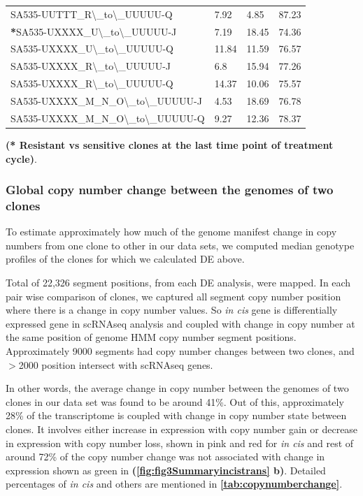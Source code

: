 \begin{table}[htbp]
\begin{tabular}{|l|l|l|l|}
     SA535-UUTTT\_R\textbackslash{}\_to\textbackslash{}\_UUUUU-Q & 7.92 & 4.85 & 87.23 \\
     \textbf{*}SA535-UXXXX\_U\textbackslash{}\_to\textbackslash{}\_UUUUU-J & 7.19 & 18.45 & 74.36 \\
     SA535-UXXXX\_U\textbackslash{}\_to\textbackslash{}\_UUUUU-Q & 11.84 & 11.59 & 76.57 \\
     SA535-UXXXX\_R\textbackslash{}\_to\textbackslash{}\_UUUUU-J & 6.8 & 15.94 & 77.26 \\
     SA535-UXXXX\_R\textbackslash{}\_to\textbackslash{}\_UUUUU-Q & 14.37 & 10.06 & 75.57 \\
     SA535-UXXXX\_M\_N\_O\textbackslash{}\_to\textbackslash{}\_UUUUU-J & 4.53 & 18.69 & 76.78 \\
     SA535-UXXXX\_M\_N\_O\textbackslash{}\_to\textbackslash{}\_UUUUU-Q & 9.27 & 12.36 & 78.37 \\
   \hline 
 \end{tabular}%
\label{tab:copynumberchange}%

  \small\textbf{(* Resistant vs sensitive clones at the last time point of treatment cycle)}.
\end{table}%

\subsubsection{Global copy number change between the genomes of two clones}

To estimate approximately how much of the genome manifest change in copy numbers from one clone to other in our data sets, we computed median genotype profiles of the clones for which we calculated \ac{DE} above.

Total of 22,326 segment positions, from each DE analysis, were mapped. In each pair wise comparison of clones, we captured all segment copy number position where there is a change in copy number values. So \textit{in cis} gene is differentially expressed gene in scRNAseq analysis and coupled with change in copy number at the same position of genome HMM copy number segment positions. Approximately 9000 segments had copy number changes between two clones, and $>$2000 position intersect with scRNAseq genes.

In other words, the average change in copy number between the genomes of two clones in our data set was found to be around 41\%. Out of this, approximately 28\% of the transcriptome is coupled with change in copy number state between clones. It involves either increase in expression with copy number gain or decrease in expression with copy number loss, shown in pink and red for \textit{in cis} and rest of  around 72\% of the copy number change was not associated with change in expression shown as green in \textbf{(\autoref{fig:fig3Summaryincistrans} b)}. Detailed percentages of \textit{in cis} and others are mentioned in 
\textbf{\autoref{tab:copynumberchange}}.

